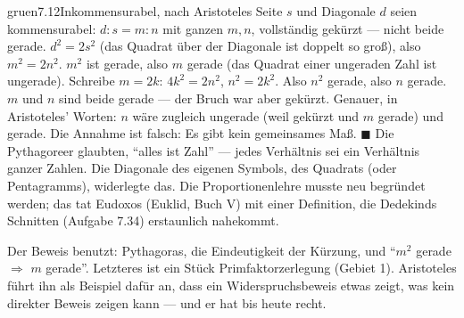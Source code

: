 \begin{loesungkarte}{gruen}{7.12}{Inkommensurabel, nach Aristoteles}
Seite $s$ und Diagonale $d$ seien kommensurabel: $d : s = m : n$ mit ganzen $m, n$, vollständig gekürzt --- nicht beide gerade.
$d^{2} = 2s^{2}$ (das Quadrat über der Diagonale ist doppelt so groß), also $m^{2} = 2n^{2}$.
$m^{2}$ ist gerade, also $m$ gerade (das Quadrat einer ungeraden Zahl ist ungerade). Schreibe $m = 2k$: $4k^{2} = 2n^{2}$, $n^{2} = 2k^{2}$. Also $n^{2}$ gerade, also $n$ gerade.
$m$ und $n$ sind beide gerade --- der Bruch war aber gekürzt. Genauer, in Aristoteles' Worten: $n$ wäre zugleich ungerade (weil gekürzt und $m$ gerade) und gerade. Die Annahme ist falsch: Es gibt kein gemeinsames Maß. $\blacksquare$
Die Pythagoreer glaubten, \enquote{alles ist Zahl} --- jedes Verhältnis sei ein Verhältnis ganzer Zahlen. Die Diagonale des eigenen Symbols, des Quadrats (oder Pentagramms), widerlegte das. Die Proportionenlehre musste neu begründet werden; das tat Eudoxos (Euklid, Buch V) mit einer Definition, die Dedekinds Schnitten (Aufgabe 7.34) erstaunlich nahekommt.
\begin{mitnehmen}\kastentext
Der Beweis benutzt: Pythagoras, die Eindeutigkeit der Kürzung, und \enquote{$m^{2}$ gerade $\Rightarrow$ $m$ gerade}. Letzteres ist ein Stück Primfaktorzerlegung (Gebiet 1). Aristoteles führt ihn als Beispiel dafür an, dass ein Widerspruchsbeweis etwas zeigt, was kein direkter Beweis zeigen kann --- und er hat bis heute recht.
\end{mitnehmen}
\end{loesungkarte}

